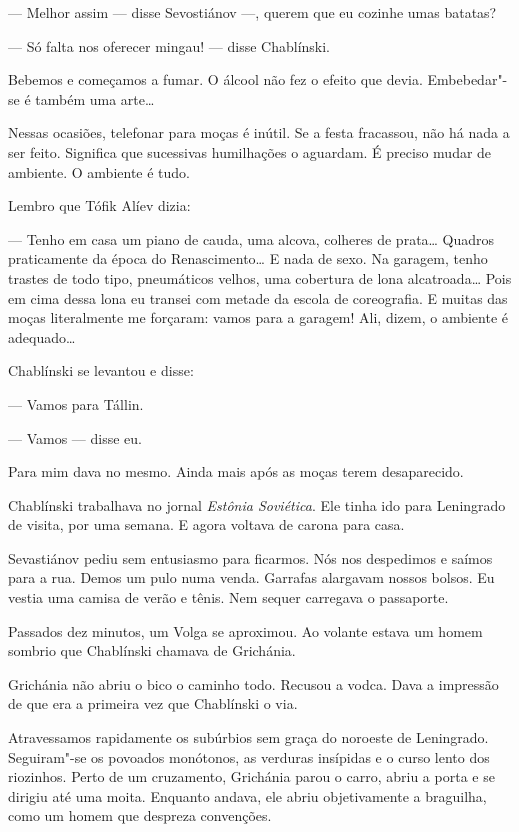 --- Melhor assim --- disse Sevostiánov ---, querem que eu cozinhe umas
batatas?

--- Só falta nos oferecer mingau! --- disse Chablínski.

Bebemos e começamos a fumar. O álcool não fez o efeito que devia.
Embebedar"-se é também uma arte\ldots{}

Nessas ocasiões, telefonar para moças é inútil. Se a festa fracassou,
não há nada a ser feito. Significa que sucessivas humilhações o
aguardam. É preciso mudar de ambiente. O ambiente é tudo.

Lembro que Tófik Alíev dizia:

--- Tenho em casa um piano de cauda, uma alcova, colheres de prata\ldots{}
Quadros praticamente da época do Renascimento\ldots{} E nada de sexo. Na
garagem, tenho trastes de todo tipo, pneumáticos velhos, uma cobertura
de lona alcatroada\ldots{} Pois em cima dessa lona eu transei com metade da
escola de coreografia. E muitas das moças literalmente me forçaram:
vamos para a garagem! Ali, dizem, o ambiente é adequado\ldots{}

Chablínski se levantou e disse:

--- Vamos para Tállin.

--- Vamos --- disse eu.

Para mim dava no mesmo. Ainda mais após as moças terem desaparecido.

Chablínski trabalhava no jornal \emph{Estônia Soviética}. Ele tinha ido
para Leningrado de visita, por uma semana. E agora voltava de carona
para casa.

Sevastiánov pediu sem entusiasmo para ficarmos. Nós nos despedimos e
saímos para a rua. Demos um pulo numa venda. Garrafas alargavam nossos \label{ref3}
bolsos. Eu vestia uma camisa de verão e tênis. Nem sequer carregava o
passaporte.

Passados dez minutos, um Volga se aproximou. Ao volante estava um homem
sombrio que Chablínski chamava de Grichánia.

Grichánia não abriu o bico o caminho todo. Recusou a vodca. Dava a
impressão de que era a primeira vez que Chablínski o via.

Atravessamos rapidamente os subúrbios sem graça do noroeste de
Leningrado. Seguiram"-se os povoados monótonos, as verduras insípidas e o
curso lento dos riozinhos. Perto de um cruzamento, Grichánia parou o
carro, abriu a porta e se dirigiu até uma moita. Enquanto andava, ele
abriu objetivamente a braguilha, como um homem que despreza convenções.

